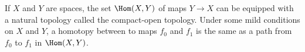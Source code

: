 If $X$ and $Y$ are spaces, the set $\Hom(X, Y)$ of maps $Y \to X$ can be equipped with a
natural topology called the compact-open topology. Under some mild conditions on
$X$ and $Y$, a homotopy between to maps $f_0$ and $f_1$ is the same as a path from
$f_0$ to $f_1$ in $\Hom(X, Y)$.

